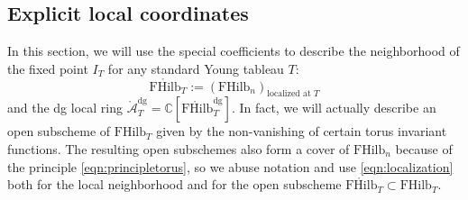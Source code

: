 \documentclass[12pt]{amsart}
\numberwithin{equation}{section}
\theoremstyle{definition}
\theoremstyle{remark}
\newcommand{\CC}{\mathbb{C}}
\newcommand{\CA}{\mathcal{A}}
\newcommand{\CT}{\mathcal{T}}
\renewcommand{\1}{\mathbf{1}}
\newcommand{\FH}{\mathrm{FHilb}}
\newcommand{\oFH}{\mathring{\FH}}
\newcommand{\torus}{\CC^{*} \times \CC^*}
\newcommand{\oCA}{\mathring{\CA}}
\newcommand{\dg}{\text{dg}}%
\begin{document}




\subsection{Explicit local coordinates}
\label{sub:localcoord}

In this section, we will use the special coefficients to describe the neighborhood of the fixed point $I_T$ for any standard Young tableau $T$:
\begin{equation}
\label{eqn:localization}
\oFH_T := \left( \FH_n \right)_{\text{localized at }T}
\end{equation}
and the dg local ring $\oCA^\dg_T = \CC [\oFH^\dg_T ]$. In fact, we will actually describe an open subscheme of $\FH_T$ given by the non-vanishing of certain torus invariant functions. The resulting open subschemes also form a cover of $\FH_n$ because of the principle \eqref{eqn:principletorus}, so we abuse notation and use \eqref{eqn:localization} both for the local neighborhood and for the open subscheme $\oFH_T \subset \FH_T$.  
\end{document}
